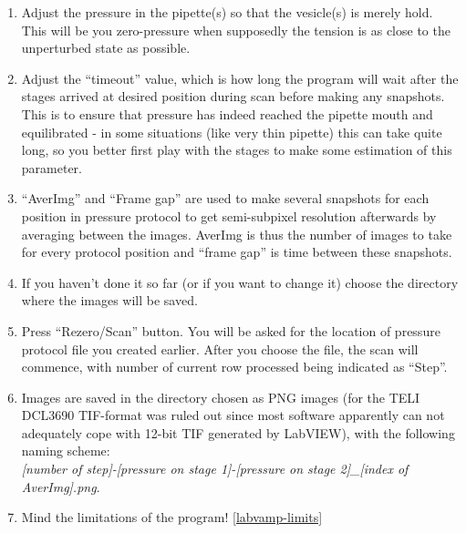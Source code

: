 \documentclass[a4paper,12pt]{article}
\begin{document}
\begin{enumerate}
\begin{enumerate}
		\item Adjust the pressure in the pipette(s) so that the vesicle(s) is merely hold. This will be you zero-pressure when supposedly the tension is as close to the unperturbed state as possible.
		\item Adjust the ``timeout'' value, which is how long the program will wait after the stages arrived at desired position during scan before making any snapshots. This is to ensure that pressure has indeed reached the pipette mouth and equilibrated - in some situations (like very thin pipette) this can take quite long, so you better first play with the stages to make some estimation of this parameter.
		\item ``AverImg'' and ``Frame gap'' are used to make several snapshots for each position in pressure protocol to get semi-subpixel resolution afterwards by averaging between the images. AverImg is thus the number of images to take for every protocol position and ``frame gap'' is time between these snapshots.
		\item If you haven't done it so far (or if you want to change it) choose the directory where the images will be saved.
		\item Press ``Rezero/Scan'' button. You will be asked for the location of pressure protocol file you created earlier. After you choose the file, the scan will commence, with number of current row processed being indicated as ``Step''.
		\item Images are saved in the directory chosen as PNG images (for the TELI DCL3690 TIF-format was ruled out since most software apparently can not adequately cope with 12-bit TIF generated by LabVIEW), with the following naming scheme:\\ \emph{[number of step]-[pressure on stage 1]-[pressure on stage 2]\_[index of AverImg].png}.
		\item Mind the limitations of the program! \ref{labvamp-limits}
	\end{enumerate}
\end{enumerate}
\end{document}
